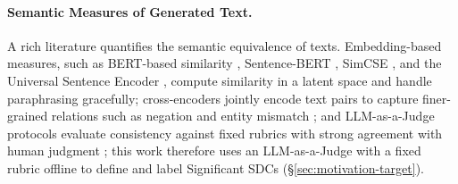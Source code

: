 \paragraph{Semantic Measures of Generated Text.}
A rich literature quantifies the semantic equivalence of texts. Embedding-based measures, such as BERT-based similarity \cite{devlin2019bert}, Sentence-BERT \cite{reimers2019sentence}, SimCSE \cite{gao2021simcse}, and the Universal Sentence Encoder \cite{cer2018universal}, compute similarity in a latent space and handle paraphrasing gracefully; cross-encoders jointly encode text pairs to capture finer-grained relations such as negation and entity mismatch \cite{nogueira2019passage,deshpande2023c,lin2025using}; and LLM-as-a-Judge protocols evaluate consistency against fixed rubrics with strong agreement with human judgment \cite{liu2023g,zheng2023judging}; this work therefore uses an LLM-as-a-Judge with a fixed rubric offline to define and label Significant SDCs (\S\ref{sec:motivation-target}).


